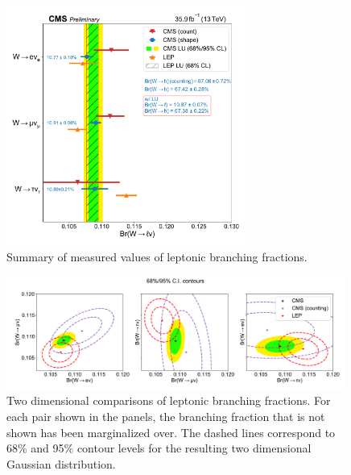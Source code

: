             
\begin{figure}[htb!]
    \begin{center}
    \includegraphics[width=0.7\textwidth]{chapters/Analysis/sectionResult/figures/unblinded_summary_plot.pdf}
    \caption{Summary of measured values of leptonic branching fractions.}
    \label{fig:wbr_result_1D}
    \end{center}
\end{figure}


\begin{figure}[htb!]
    \begin{center}
    \includegraphics[width=0.99\textwidth]{chapters/Analysis/sectionResult/figures/result_contours_2d.pdf}
    \caption{Two dimensional comparisons of leptonic branching
    fractions.  For each pair shown in the panels, the branching
    fraction that is not shown has been marginalized over.  The dashed
    lines correspond to 68\% and 95\% contour levels for the resulting two
    dimensional Gaussian distribution.}
    \label{fig:contours_2D}
    \end{center}
\end{figure}


